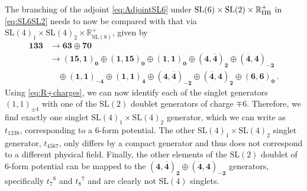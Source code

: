 \documentclass[a4paper, 11pt]{article}
\numberwithin{equation}{section}
\newcommand{\SL}[1]{\mathrm{SL}( #1 )}
\newcommand{\+}{\oplus}
\begin{document}
The branching of the adjoint \eqref{eq:AdjointSL6} under $\SL{6} \times \SL{2} \times \mathbb{R}^+_{\rm IIB}$ in \eqref{eq:SL6SL2} needs to now be compared with that via $\SL{4}_1 \times \SL{4}_2 \times \mathbb{R}^+_{\SL{8}}$, given by
\begin{equation} \label{eq:133DecompSL4SL4}
	\begin{split}
		\mathbf{133} &\rightarrow \mathbf{63} \oplus \mathbf{70} \\
		&\rightarrow \mathbf{\left(15,1\right)_0} \oplus \mathbf{\left(1,15\right)_0} \oplus \mathbf{\left(1,1\right)_0} \oplus \mathbf{\left(4,\overline{4}\right)_2} \oplus \mathbf{\left(\overline{4},4\right)_{-2}} \\
		& \quad \oplus \mathbf{\left(1,1\right)_{-4}} \oplus \mathbf{\left(1,1\right)_{4}} \oplus \mathbf{\left(4,\overline{4}\right)_{-2}} \oplus \mathbf{\left(\overline{4},4\right)_{2}} \oplus \mathbf{\left(6,6\right)_0} \,.
	\end{split}
\end{equation}
Using \eqref{eq:R+charges}, we can now identify each of the singlet generators $\left(1,1\right)_{\pm4}$ with one of the $\SL{2}$ doublet generators of charge $\mp 6$. Therefore, we find exactly one singlet $\SL{4}_1 \times \SL{4}_2$ generator, which we can write as $t_{1238}$, corresponding to a 6-form potential. The other $\SL{4}_1 \times \SL{4}_2$ singlet generator, $t_{4567}$, only differs by a compact generator and thus does not correspond to a different physical field. Finally, the other elements of the $\SL{2}$ doublet of 6-form potential can be mapped to the $\mathbf{\left(4,\overline{4}\right)_{2}} \oplus \mathbf{\left(\overline{4},4\right)_{-2}}$ generators, specifically $t_7{}^8$ and $t_8{}^7$ and are clearly not $\SL{4}$ singlets.
\end{document}
